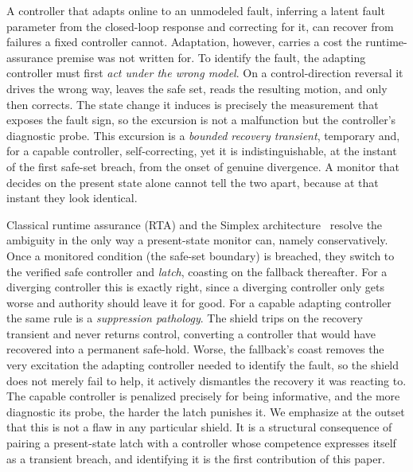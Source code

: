 \documentclass[journal]{IEEEtran}
\theoremstyle{plain}
\theoremstyle{definition}
\begin{document}
A controller that adapts online to an unmodeled fault, inferring a latent fault parameter
from the closed-loop response and correcting for it, can recover from failures a fixed
controller cannot. Adaptation, however, carries a cost the runtime-assurance premise was not
written for. To identify the fault, the adapting controller must first \emph{act under the
wrong model}. On a control-direction reversal it drives the wrong way, leaves the safe set,
reads the resulting motion, and only then corrects. The state change it induces is precisely
the measurement that exposes the fault sign, so the excursion is not a malfunction but the
controller's diagnostic probe. This excursion is a \emph{bounded recovery transient},
temporary and, for a capable controller, self-correcting, yet it is indistinguishable, at
the instant of the first safe-set breach, from the onset of genuine divergence. A monitor
that decides on the present state alone cannot tell the two apart, because at that instant
they look identical.

Classical runtime assurance (RTA) and the Simplex architecture~\cite{Sha2001,Hook2016}
resolve the ambiguity in the only way a present-state monitor can, namely conservatively.
Once a monitored condition (the safe-set boundary) is breached, they switch to the verified
safe controller and \emph{latch}, coasting on the fallback thereafter. For a diverging
controller this is exactly right, since a diverging controller only gets worse and authority
should leave it for good. For a capable adapting controller the same rule is a
\emph{suppression pathology}. The shield trips on the recovery transient and never returns
control, converting a controller that would have recovered into a permanent safe-hold.
Worse, the fallback's coast removes the very excitation the adapting controller needed to
identify the fault, so the shield does not merely fail to help, it actively dismantles the
recovery it was reacting to. The capable controller is penalized precisely for being
informative, and the more diagnostic its probe, the harder the latch punishes it. We
emphasize at the outset that this is not a flaw in any particular shield. It is a structural
consequence of pairing a present-state latch with a controller whose competence expresses
itself as a transient breach, and identifying it is the first contribution of this paper.
\end{document}

